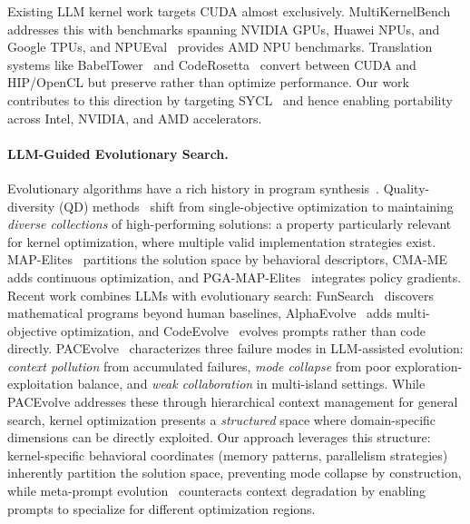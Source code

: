 Existing LLM kernel work targets CUDA almost exclusively. MultiKernelBench~\citep{wen2025multikernelbench} addresses this with benchmarks spanning NVIDIA GPUs, Huawei NPUs, and Google TPUs, and %
NPUEval~\citep{kalade2025npueval} provides AMD NPU benchmarks. Translation systems like BabelTower~\citep{wen2022babeltower} and CodeRosetta~\citep{tehrani2024coderosetta} convert between CUDA and HIP/OpenCL but preserve rather than optimize performance. Our work contributes to this direction by targeting SYCL~\citep{keryell2015khronos} and hence enabling portability across Intel, NVIDIA, and AMD accelerators. 

\paragraph{LLM-Guided Evolutionary Search.}
Evolutionary algorithms have a rich history in program synthesis~\citep{geneticprogramming}. Quality-diversity (QD) methods~\citep{pugh2016quality} shift from single-objective optimization to maintaining \textit{diverse collections} of high-performing solutions: a property particularly relevant for kernel optimization, where multiple valid implementation strategies exist. MAP-Elites~\citep{mouret2015illuminating} partitions the solution space by behavioral descriptors, CMA-ME~\citep{cmame} adds continuous optimization, and PGA-MAP-Elites~\citep{pgamapelites} integrates policy gradients. Recent work combines LLMs with evolutionary search: FunSearch~\citep{romera2024mathematical} discovers mathematical programs beyond human baselines, AlphaEvolve~\citep{novikov2025alphaevolve} adds multi-objective optimization, and CodeEvolve~\citep{codeevolve} evolves prompts rather than code directly.
PACEvolve~\citep{yan2026pacevolve} characterizes three failure modes in LLM-assisted evolution: \textit{context pollution} from accumulated failures, \textit{mode collapse} from poor exploration-exploitation balance, and \textit{weak collaboration} in multi-island settings. While PACEvolve addresses these through hierarchical context management for general search, kernel optimization presents a \textit{structured} space where domain-specific dimensions can be directly exploited. Our approach leverages this structure: kernel-specific behavioral coordinates (memory patterns, parallelism strategies) inherently partition the solution space, preventing mode collapse by construction, while meta-prompt evolution~\citep{gepa} counteracts context degradation by enabling prompts to specialize for different optimization regions.

